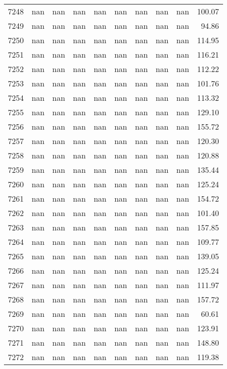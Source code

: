 \begin{tabular}{lrrrrrrrrr}
7248 & nan & nan & nan & nan & nan & nan & nan & nan & 100.07 \\
7249 & nan & nan & nan & nan & nan & nan & nan & nan & 94.86 \\
7250 & nan & nan & nan & nan & nan & nan & nan & nan & 114.95 \\
7251 & nan & nan & nan & nan & nan & nan & nan & nan & 116.21 \\
7252 & nan & nan & nan & nan & nan & nan & nan & nan & 112.22 \\
7253 & nan & nan & nan & nan & nan & nan & nan & nan & 101.76 \\
7254 & nan & nan & nan & nan & nan & nan & nan & nan & 113.32 \\
7255 & nan & nan & nan & nan & nan & nan & nan & nan & 129.10 \\
7256 & nan & nan & nan & nan & nan & nan & nan & nan & 155.72 \\
7257 & nan & nan & nan & nan & nan & nan & nan & nan & 120.30 \\
7258 & nan & nan & nan & nan & nan & nan & nan & nan & 120.88 \\
7259 & nan & nan & nan & nan & nan & nan & nan & nan & 135.44 \\
7260 & nan & nan & nan & nan & nan & nan & nan & nan & 125.24 \\
7261 & nan & nan & nan & nan & nan & nan & nan & nan & 154.72 \\
7262 & nan & nan & nan & nan & nan & nan & nan & nan & 101.40 \\
7263 & nan & nan & nan & nan & nan & nan & nan & nan & 157.85 \\
7264 & nan & nan & nan & nan & nan & nan & nan & nan & 109.77 \\
7265 & nan & nan & nan & nan & nan & nan & nan & nan & 139.05 \\
7266 & nan & nan & nan & nan & nan & nan & nan & nan & 125.24 \\
7267 & nan & nan & nan & nan & nan & nan & nan & nan & 111.97 \\
7268 & nan & nan & nan & nan & nan & nan & nan & nan & 157.72 \\
7269 & nan & nan & nan & nan & nan & nan & nan & nan & 60.61 \\
7270 & nan & nan & nan & nan & nan & nan & nan & nan & 123.91 \\
7271 & nan & nan & nan & nan & nan & nan & nan & nan & 148.80 \\
7272 & nan & nan & nan & nan & nan & nan & nan & nan & 119.38 \\

\end{tabular}

